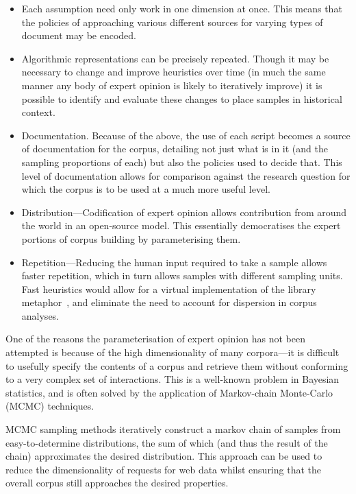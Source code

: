 \begin{itemize}
    \item Each assumption need only work in one dimension at once.  This means that the policies of approaching various different sources for varying types of document may be encoded.
    \item Algorithmic representations can be precisely repeated.  Though it may be necessary to change and improve heuristics over time (in much the same manner any body of expert opinion is likely to iteratively improve) it is possible to identify and evaluate these changes to place samples in historical context.
    \item Documentation.  Because of the above, the use of each script becomes a source of documentation for the corpus, detailing not just what is in it (and the sampling proportions of each) but also the policies used to decide that.  This level of documentation allows for comparison against the research question for which the corpus is to be used at a much more useful level.
    \item Distribution---Codification of expert opinion allows contribution from around the world in an open-source model.  This essentially democratises the expert portions of corpus building by parameterising them.
    \item Repetition---Reducing the human input required to take a sample allows faster repetition, which in turn allows samples with different sampling units.  Fast heuristics would allow for a virtual implementation of the library metaphor~\cite{evert2006random}, and eliminate the need to account for dispersion in corpus analyses.
\end{itemize}


One of the reasons the parameterisation of expert opinion has not been attempted is because of the high dimensionality of many corpora---it is difficult to usefully specify the contents of a corpus and retrieve them without conforming to a very complex set of interactions.  This is a well-known problem in Bayesian statistics, and is often solved by the application of Markov-chain Monte-Carlo (MCMC) techniques.

MCMC sampling methods iteratively construct a markov chain of samples from easy-to-determine distributions, the sum of which (and thus the result of the chain) approximates the desired distribution.  This approach can be used to reduce the dimensionality of requests for web data whilst ensuring that the overall corpus still approaches the desired properties.
     
